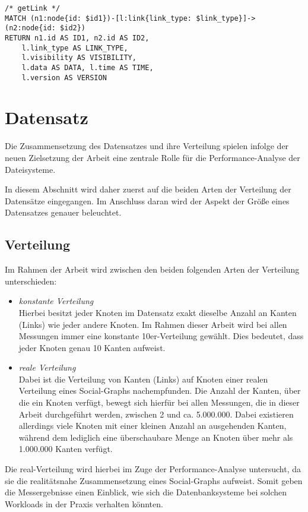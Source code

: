 \begin{lstlisting}[label=src:cypher_id_queries,caption={Cypher ID-Queries},language=CQL]
/* getLink */
MATCH (n1:node{id: $id1})-[l:link{link_type: $link_type}]->(n2:node{id: $id2}) 
RETURN n1.id AS ID1, n2.id AS ID2, 
    l.link_type AS LINK_TYPE, 
    l.visibility AS VISIBILITY, 
    l.data AS DATA, l.time AS TIME, 
    l.version AS VERSION
\end{lstlisting}

\section{Datensatz}
\label{analyse:datensatz}
Die Zusammensetzung des Datensatzes und ihre Verteilung spielen infolge der neuen Zielsetzung der Arbeit eine zentrale Rolle für die Performance-Analyse der Dateisysteme.

In diesem Abschnitt wird daher zuerst auf die beiden Arten der Verteilung der Datensätze eingegangen. Im Anschluss daran wird der Aspekt der Größe eines Datensatzes genauer beleuchtet.

\subsection{Verteilung}
Im Rahmen der Arbeit wird zwischen den beiden folgenden Arten der Verteilung unterschieden:
\begin{itemize}
    \item \textit{konstante Verteilung}\\
    Hierbei besitzt jeder Knoten im Datensatz exakt dieselbe Anzahl an Kanten (Links) wie jeder andere Knoten. Im Rahmen dieser Arbeit wird bei allen Messungen immer eine konstante 10er-Verteilung gewählt. Dies bedeutet, dass jeder Knoten genau 10 Kanten aufweist. 
    \item \textit{reale Verteilung}\\
    Dabei ist die Verteilung von Kanten (Links) auf Knoten einer realen Verteilung eines Social-Graphs nachempfunden. Die Anzahl der Kanten, über die ein Knoten verfügt, bewegt sich hierfür bei allen Messungen, die in dieser Arbeit durchgeführt werden, zwischen 2 und ca. 5.000.000. Dabei existieren allerdings viele Knoten mit einer kleinen Anzahl an ausgehenden Kanten, während dem lediglich eine überschaubare Menge an Knoten über mehr als 1.000.000 Kanten verfügt.
\end{itemize}
Die real-Verteilung wird hierbei im Zuge der Performance-Analyse untersucht, da sie die realitätsnahe Zusammensetzung eines Social-Graphs aufweist. Somit geben die Messergebnisse einen Einblick, wie sich die Datenbanksysteme bei solchen Workloads in der Praxis verhalten könnten.

